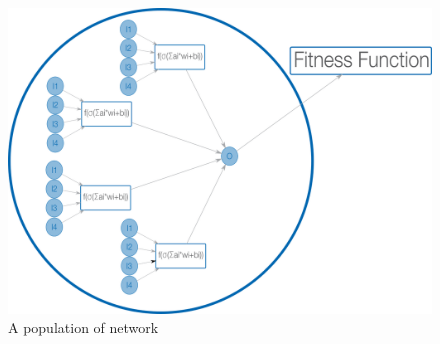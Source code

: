 \documentclass[10pt,a4paper,oneside]{article}
\begin{document}
\begin{figure}[!h]
\centering
\includegraphics[scale=0.5]{./images/PNG/Population.png}
\caption{A population of network}
\label{pop}
\end{figure}

\vspace{0.8cm}
\end{document}
